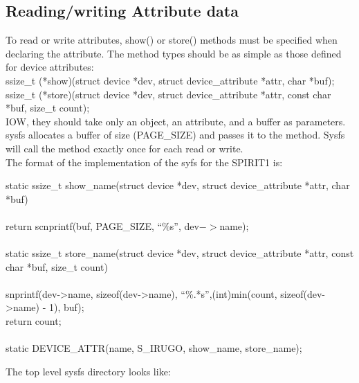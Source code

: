 \subsection{Reading/writing Attribute data}
To read or write attributes, show() or store() methods must be
specified when declaring the attribute. The method types should be as
simple as those defined for device attributes:\\
ssize\_t (*show)(struct device *dev, struct device\_attribute *attr, char *buf);\\
ssize\_t (*store)(struct device *dev, struct device\_attribute *attr,
                 const char *buf, size\_t count);\\
		 IOW, they should take only an object, an attribute, and a buffer as parameters.\\
		 sysfs allocates a buffer of size (PAGE\_SIZE) and passes it to the
		 method. Sysfs will call the method exactly once for each read or
		 write.\\
		 The format of the implementation of the syfs for the SPIRIT1 is:\\
		 \begin{code}
		 static ssize\_t show\_name(struct device *dev, struct device\_attribute *attr,
		                          char *buf)\\
		\lbrace \\
		return scnprintf(buf, PAGE\_SIZE, ``\%s'', dev$->$name);\\
		\rbrace \\
		static ssize\_t store\_name(struct device *dev, struct device\_attribute *attr,
		                          const char *buf, size\_t count)\\
		\lbrace \\
		snprintf(dev->name, sizeof(dev->name), ``\%.*s'',(int)min(count, sizeof(dev->name) - 1), buf);\\
		return count;\\
		\rbrace\\
		static DEVICE\_ATTR(name, S\_IRUGO, show\_name, store\_name);\\
		\end{code}
		The top level sysfs directory looks like:\\

